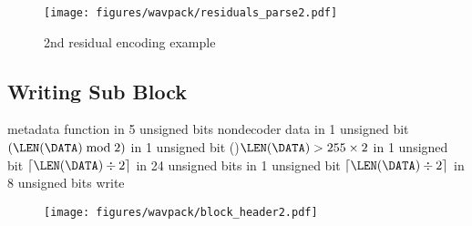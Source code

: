 \begin{figure}[h]
  \texttt{[image: figures/wavpack/residuals\_parse2.pdf]}
  \caption{2nd residual encoding example}
\end{figure}

\clearpage

\subsection{Writing Sub Block}
{
\WRITE metadata function in 5 unsigned bits\;
\WRITE nondecoder data in 1 unsigned bit\;
\WRITE $(\LEN(\text{\DATA}) \bmod 2)$ in 1 unsigned bit
\eIf(){$\LEN(\text{\DATA}) > 255 \times 2$}{
   in 1 unsigned bit\;
  \WRITE $\lceil\LEN(\text{\DATA}) \div 2\rceil$ in 24 unsigned bits\;
}{
   in 1 unsigned bit\;
  \WRITE  $\lceil\LEN(\text{\DATA}) \div 2\rceil$ in 8 unsigned bits\;
}
write \DATA\;
\EALGORITHM
}

\begin{figure}[h]
\texttt{[image: figures/wavpack/block\_header2.pdf]}
\end{figure}

\clearpage

